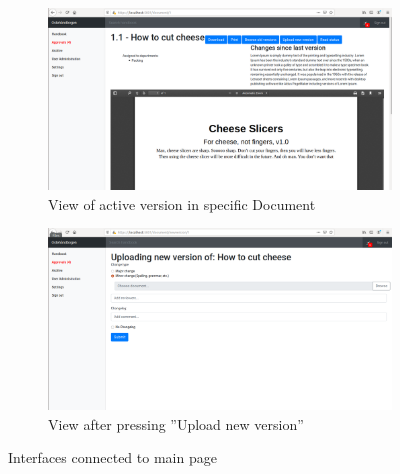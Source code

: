 \begin{figure}[H]\ContinuedFloat
	\centering
	\begin{subfigure}[b]{0.48\textwidth}
		\includegraphics[width=\textwidth]{billeder/iteration1Prototyper/Document-view.png}
		\caption{View of active version in specific Document}
		\label{fig:3-DocView}
	\end{subfigure}
	\quad
	\begin{subfigure}[b]{0.48\textwidth}
		\includegraphics[width=\textwidth]{billeder/iteration1Prototyper/Upload-version.png}
		\caption{View after pressing ''Upload new version''}
		\label{fig:3-UploadVer}
	\end{subfigure}
	\caption{Interfaces connected to main page}\label{fig:3-MainPages}
\end{figure}

